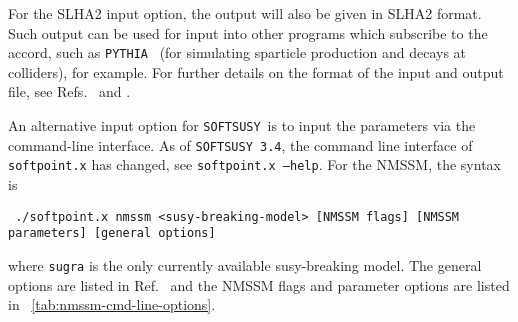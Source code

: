 \documentclass[final,3p,times,pdflatex]{elsarticle}
\def\SOFTSUSY{{\tt SOFTSUSY}}
\def\code#1{\small{\tt #1}\normalsize}
\begin{document}
For the SLHA2 input option, 
the output will also be given in 
SLHA2 format. Such output can be used for
input into other programs which subscribe to the accord, such as
\code{PYTHIA}~\cite{Sjostrand:2007gs} (for
simulating sparticle production and decays at colliders), for example. For
further details on the format of 
the input and output file, see Refs.~\cite{Allanach:2008qq} and \cite{Skands:2003cj}.

An alternative input option for \SOFTSUSY\ is to input the parameters via the command-line interface. As of {\tt SOFTSUSY 3.4}, the command line interface of \code{softpoint.x} has
changed, see \code{softpoint.x --help}.  For the NMSSM, the syntax is
%
\small
\begin{verbatim}
 ./softpoint.x nmssm <susy-breaking-model> [NMSSM flags] [NMSSM parameters] [general options]
\end{verbatim}
\normalsize
%
where \code{sugra} is the only currently available susy-breaking
model.  The general options are listed in Ref.~\cite{Allanach:2001kg}
and the NMSSM flags and
parameter options are listed in
\tablename~\ref{tab:nmssm-cmd-line-options}.
%
\end{document}
